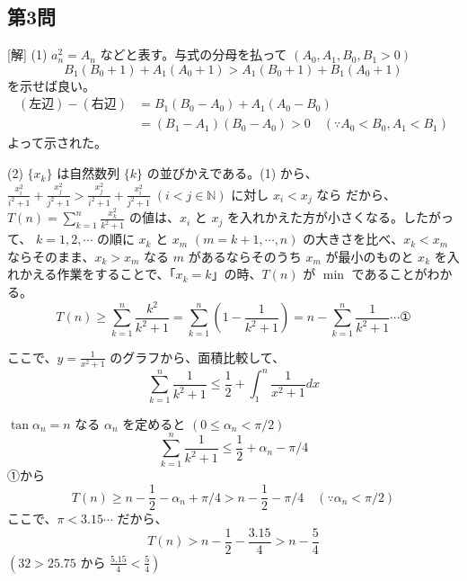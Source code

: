 \documentclass[../main.tex]{subfiles}
\begin{document}
\subsection*{第3問}
[解] (1) $a_n^2 = A_n$ などと表す。与式の分母を払って $(A_0, A_1, B_0, B_1 > 0)$
$$ B_1 (B_0 + 1) + A_1 (A_0 + 1) > A_1 (B_0 + 1) + B_1 (A_0 + 1) $$
を示せば良い。
\begin{align*}
  (\text{左辺}) - (\text{右辺}) &= B_1 (B_0 - A_0) + A_1 (A_0 - B_0) \\
  &= (B_1 - A_1) (B_0 - A_0) > 0 \quad (\because A_0 < B_0, A_1 < B_1)
\end{align*}
よって示された。

(2) $\{x_k\}$ は自然数列 $\{k\}$ の並びかえである。(1) から、$\frac{x_i^2}{i^2+1} + \frac{x_j^2}{j^2+1} > \frac{x_j^2}{i^2+1} + \frac{x_i^2}{j^2+1} \; (i < j \in \mathbb{N})$ に対し $x_i < x_j$ なら
だから、$T(n) = \sum_{k=1}^n \frac{x_k^2}{k^2+1}$ の値は、$x_i$ と $x_j$ を入れかえた方が小さくなる。したがって、
$k = 1, 2, \cdots$ の順に $x_k$ と $x_m$ $(m = k+1, \cdots, n)$ の大きさを比べ、$x_k < x_m$ ならそのまま、$x_k > x_m$ なる $m$ があるならそのうち $x_m$ が最小のものと $x_k$ を入れかえる作業をすることで、「$x_k = k$」の時、$T(n)$ が $\min$ であることがわかる。
$$ T(n) \ge \sum_{k=1}^n \frac{k^2}{k^2+1} = \sum_{k=1}^n \left( 1 - \frac{1}{k^2+1} \right) = n - \sum_{k=1}^n \frac{1}{k^2+1} \cdots \text{①} $$

ここで、$y = \frac{1}{x^2+1}$ のグラフから、面積比較して、
$$ \sum_{k=1}^n \frac{1}{k^2+1} \le \frac{1}{2} + \int_1^n \frac{1}{x^2+1} dx $$

\begin{center}
\end{center}

$\tan \alpha_n = n$ なる $\alpha_n$ を定めると $(0 \le \alpha_n < \pi/2)$
$$ \sum_{k=1}^n \frac{1}{k^2+1} \le \frac{1}{2} + \alpha_n - \pi/4 $$
①から
$$ T(n) \ge n - \frac{1}{2} - \alpha_n + \pi/4 > n - \frac{1}{2} - \pi/4 \quad (\because \alpha_n < \pi/2) $$
ここで、$\pi < 3.15 \cdots$ だから、
$$ T(n) > n - \frac{1}{2} - \frac{3.15}{4} > n - \frac{5}{4} $$
$\left( 32 > 25.75 \text{ から } \frac{5.15}{4} < \frac{5}{4} \right)$
\end{document}

